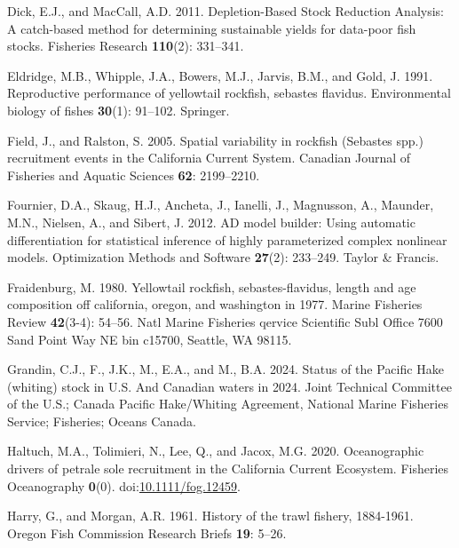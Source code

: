 \documentclass[
]{scrartcl}
\newlength{\cslhangindent}
\newenvironment{CSLReferences}[2] %
 {\begin{list}{}{%
  \setlength{\itemindent}{0pt}
  \setlength{\leftmargin}{0pt}
  \setlength{\parsep}{0pt}
  \ifodd #1
   \setlength{\leftmargin}{\cslhangindent}
   \setlength{\itemindent}{-1\cslhangindent}
  \fi
  \setlength{\itemsep}{#2\baselineskip}}}
 {\end{list}}
\begin{document}
\begin{CSLReferences}{1}{0}
Dick, E.J., and MacCall, A.D. 2011. {Depletion-Based Stock Reduction
Analysis: A catch-based method for determining sustainable yields for
data-poor fish stocks}. Fisheries Research \textbf{110}(2): 331--341.

Eldridge, M.B., Whipple, J.A., Bowers, M.J., Jarvis, B.M., and Gold, J.
1991. Reproductive performance of yellowtail rockfish, sebastes
flavidus. Environmental biology of fishes \textbf{30}(1): 91--102.
Springer.

Field, J., and Ralston, S. 2005. {Spatial variability in rockfish
(Sebastes spp.) recruitment events in the California Current System}.
Canadian Journal of Fisheries and Aquatic Sciences \textbf{62}:
2199--2210.

Fournier, D.A., Skaug, H.J., Ancheta, J., Ianelli, J., Magnusson, A.,
Maunder, M.N., Nielsen, A., and Sibert, J. 2012. AD model builder: Using
automatic differentiation for statistical inference of highly
parameterized complex nonlinear models. Optimization Methods and
Software \textbf{27}(2): 233--249. Taylor \& Francis.

Fraidenburg, M. 1980. Yellowtail rockfish, sebastes-flavidus, length and
age composition off california, oregon, and washington in 1977. Marine
Fisheries Review \textbf{42}(3-4): 54--56. Natl Marine Fisheries qervice
Scientific Subl Office 7600 Sand Point Way NE bin c15700, Seattle, WA
98115.

Grandin, C.J., F., J.K., M., E.A., and M., B.A. 2024. Status of the
{P}acific {H}ake (whiting) stock in {U}.{S}. And {C}anadian waters in
2024. Joint Technical Committee of the U.S.; Canada Pacific Hake/Whiting
Agreement, National Marine Fisheries Service; Fisheries; Oceans Canada.

Haltuch, M.A., Tolimieri, N., Lee, Q., and Jacox, M.G. 2020.
Oceanographic drivers of petrale sole recruitment in the {California}
{Current} {Ecosystem}. Fisheries Oceanography \textbf{0}(0).
doi:\href{https://doi.org/10.1111/fog.12459}{10.1111/fog.12459}.

Harry, G., and Morgan, A.R. 1961. {History of the trawl fishery,
1884-1961}. Oregon Fish Commission Research Briefs \textbf{19}: 5--26.


\end{CSLReferences}
\end{document}
